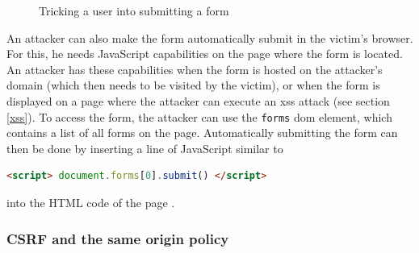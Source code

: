 \begin{figure}[htb]
	\centering
	\caption[Tricking a user into submitting a form]{Tricking a user into submitting a form \cite{Mao2009}}
	\label{fig:mao2009}
\end{figure}

An attacker can also make the form automatically submit in the victim's browser. For this, he needs JavaScript capabilities on the page where the form is located. An attacker has these capabilities when the form is hosted on the attacker's domain (which then needs to be visited by the victim), or when the form is displayed on a page where the attacker can execute an \gls{xss} attack (see section \ref{xss}). To access the form, the attacker can use the \texttt{forms} \gls{dom} element, which contains a list of all forms on the page. Automatically submitting the form can then be done by inserting a line of JavaScript similar to
\begin{lstlisting}[language=HTML]
<script> document.forms[0].submit() </script>
\end{lstlisting}
into the HTML code of the page \cite{Jovanovic2006}.

\subsubsection{CSRF and the same origin policy}


